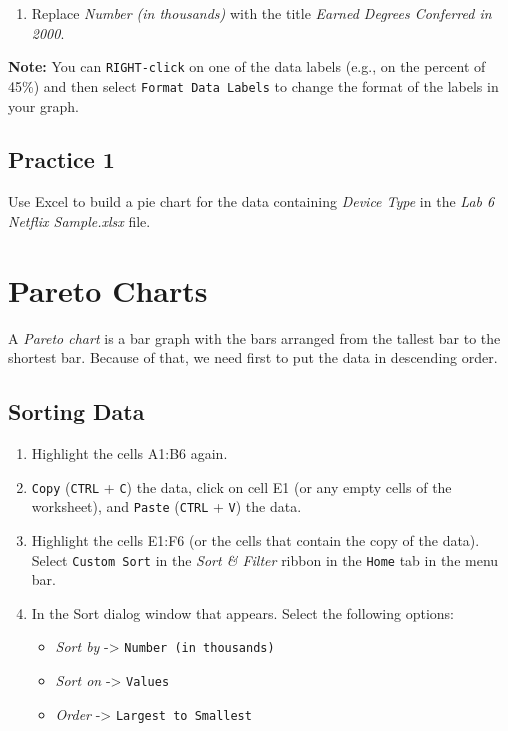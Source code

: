 \documentclass[
  12pt,
  letterpaper,
]{book}
\providecommand{\tightlist}{%
  \setlength{\itemsep}{0pt}\setlength{\parskip}{0pt}}
\begin{document}
\begin{enumerate}
\def\labelenumi{\arabic{enumi}.}
\setcounter{enumi}{6}
\tightlist
\item
  Replace \emph{Number (in thousands)} with the title \emph{Earned Degrees Conferred in 2000}.
\end{enumerate}

\textbf{Note:} You can \texttt{RIGHT-click} on one of the data labels (e.g., on the percent of 45\%) and then select \texttt{Format\ Data\ Labels} to change the format of the labels in your graph.

\hypertarget{practice-1-4}{%
\subsection{Practice 1}\label{practice-1-4}}

Use Excel to build a pie chart for the data containing \emph{Device Type} in the \emph{Lab 6 Netflix Sample.xlsx} file.

\hypertarget{pareto-charts}{%
\section{Pareto Charts}\label{pareto-charts}}

A \emph{Pareto chart} is a bar graph with the bars arranged from the tallest bar to the shortest bar. Because of that, we need first to put the data in descending order.

\hypertarget{sorting-data-1}{%
\subsection{Sorting Data}\label{sorting-data-1}}

\begin{enumerate}
\def\labelenumi{\arabic{enumi}.}
\tightlist
\item
  Highlight the cells A1:B6 again.
\item
  \texttt{Copy} (\texttt{CTRL} + \texttt{C}) the data, click on cell E1 (or any empty cells of the worksheet), and \texttt{Paste} (\texttt{CTRL} + \texttt{V}) the data.
\item
  Highlight the cells E1:F6 (or the cells that contain the copy of the data). Select \texttt{Custom\ Sort} in the \emph{Sort \& Filter} ribbon in the \texttt{Home} tab in the menu bar.
\item
  In the Sort dialog window that appears. Select the following options:

  \begin{itemize}
  \tightlist
  \item
    \emph{Sort by} -\textgreater{} \texttt{Number\ (in\ thousands)}
  \item
    \emph{Sort on} -\textgreater{} \texttt{Values}
  \item
    \emph{Order} -\textgreater{} \texttt{Largest\ to\ Smallest}
  \end{itemize}
\end{enumerate}
\end{document}
